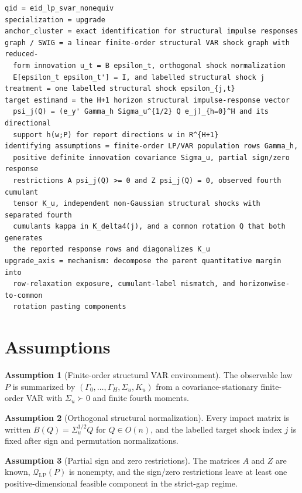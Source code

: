 \documentclass[11pt]{article}
\theoremstyle{definition}
\newtheorem{assumption}{Assumption}
\theoremstyle{plain}
\theoremstyle{remark}
\begin{document}
\begin{verbatim}
qid = eid_lp_svar_nonequiv
specialization = upgrade
anchor_cluster = exact identification for structural impulse responses
graph / SWIG = a linear finite-order structural VAR shock graph with reduced-
  form innovation u_t = B epsilon_t, orthogonal shock normalization
  E[epsilon_t epsilon_t'] = I, and labelled structural shock j
treatment = one labelled structural shock epsilon_{j,t}
target estimand = the H+1 horizon structural impulse-response vector
  psi_j(Q) = (e_y' Gamma_h Sigma_u^{1/2} Q e_j)_{h=0}^H and its directional
  support h(w;P) for report directions w in R^{H+1}
identifying assumptions = finite-order LP/VAR population rows Gamma_h,
  positive definite innovation covariance Sigma_u, partial sign/zero response
  restrictions A psi_j(Q) >= 0 and Z psi_j(Q) = 0, observed fourth cumulant
  tensor K_u, independent non-Gaussian structural shocks with separated fourth
  cumulants kappa in K_delta4(j), and a common rotation Q that both generates
  the reported response rows and diagonalizes K_u
upgrade_axis = mechanism: decompose the parent quantitative margin into
  row-relaxation exposure, cumulant-label mismatch, and horizonwise-to-common
  rotation pasting components
\end{verbatim}

\section{Assumptions}
\begin{assumption}[Finite-order structural VAR environment]\label{ass:finite-var}
The observable law \(P\) is summarized by \((\Gamma_0,\ldots,\Gamma_H,\Sigma_u,K_u)\) from a covariance-stationary finite-order VAR with \(\Sigma_u\succ0\) and finite fourth moments.
\end{assumption}

\begin{assumption}[Orthogonal structural normalization]\label{ass:orthogonal}
Every impact matrix is written \(B(Q)=\Sigma_u^{1/2}Q\) for \(Q\in O(n)\), and the labelled target shock index \(j\) is fixed after sign and permutation normalizations.
\end{assumption}

\begin{assumption}[Partial sign and zero restrictions]\label{ass:sign-zero}
The matrices \(A\) and \(Z\) are known, \(\mathcal Q_{\mathrm{LP}}(P)\) is nonempty, and the sign/zero restrictions leave at least one positive-dimensional feasible component in the strict-gap regime.
\end{assumption}
\end{document}

